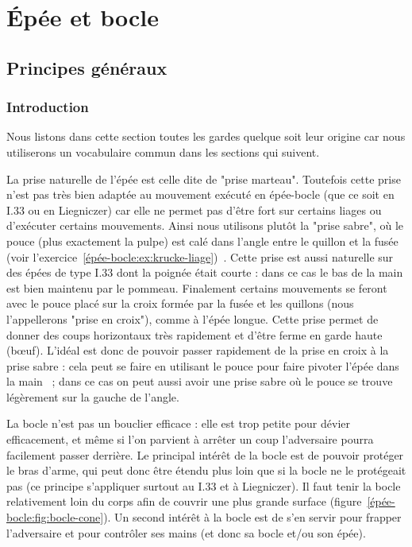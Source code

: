 \chapter{Épée et bocle}


\section{Principes généraux}


\subsection{Introduction}


Nous listons dans cette section toutes les gardes quelque soit leur origine car nous utiliserons un vocabulaire commun dans les sections qui suivent.

La prise naturelle de l'épée est celle dite de "prise marteau".
Toutefois cette prise n'est pas très bien adaptée au mouvement exécuté en épée-bocle (que ce soit en I.33 ou en Liegniczer) car elle ne permet pas d'être fort sur certains liages ou d'exécuter certains mouvements.
Ainsi nous utilisons plutôt la "prise sabre", où le pouce (plus exactement la pulpe) est calé dans l'angle entre le quillon et la fusée (voir l'exercice~\ref{épée-bocle:ex:krucke-liage})~\cite{fuhrmann:dijon:I33_liage:2015}.
Cette prise est aussi naturelle sur des épées de type I.33 dont la poignée était courte : dans ce cas le bas de la main est bien maintenu par le pommeau.
Finalement certains mouvements se feront avec le pouce placé sur la croix formée par la fusée et les quillons (nous l'appellerons "prise en croix"), comme à l'épée longue.
Cette prise permet de donner des coups horizontaux très rapidement et d'être ferme en garde haute (bœuf).
L'idéal est donc de pouvoir passer rapidement de la prise en croix à la prise sabre : cela peut se faire en utilisant le pouce pour faire pivoter l'épée dans la main~\footnotemark{} ; dans ce cas on peut aussi avoir une prise sabre où le pouce se trouve légèrement sur la gauche de l'angle.

La bocle n'est pas un bouclier efficace : elle est trop petite pour dévier efficacement, et même si l'on parvient à arrêter un coup l'adversaire pourra facilement passer derrière.
Le principal intérêt de la bocle est de pouvoir protéger le bras d'arme, qui peut donc être étendu plus loin que si la bocle ne le protégeait pas (ce principe s'appliquer surtout au I.33 et à Liegniczer).
Il faut tenir la bocle relativement loin du corps afin de couvrir une plus grande surface (figure~\ref{épée-bocle:fig:bocle-cone}).
Un second intérêt à la bocle est de s'en servir pour frapper l'adversaire et pour contrôler ses mains (et donc sa bocle et/ou son épée).

